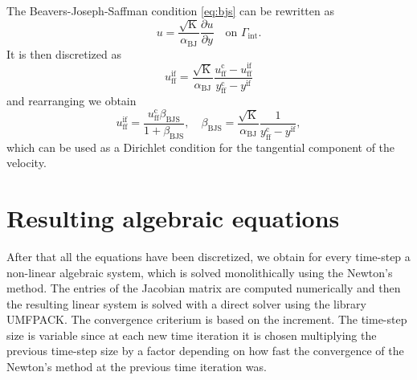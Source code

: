 The Beavers-Joseph-Saffman condition \eqref{eq:bjs} can be rewritten as
\begin{equation}
	u = \frac{\sqrt{\mathrm{K}}}{\alpha_\text{BJ}} \frac{\partial u}{\partial 
	y} \quad \text{on $\Gamma_\text{int}$}.
\end{equation}
It is then discretized as
\begin{equation} \label{eq:bjsdisc}
	u_\text{ff}^\text{if} = \frac{\sqrt{\mathrm{K}}}{\alpha_\text{BJ}} 
	\frac{u_\text{ff}^\text{c} - 
	u^\text{if}_\text{ff}}{y_\text{ff}^\text{c}-y^\text{if}}
\end{equation}
and rearranging we obtain
\begin{equation}
	u_\text{ff}^\text{if} = 	
	\frac{u^\text{c}_\text{ff} \beta_\text{BJS}}{1+\beta_\text{BJS}}, \quad 
	\beta_\text{BJS} = \frac{\sqrt{\mathrm{K}}}{\alpha_\text{BJ}} 
	\frac{1}{y_\text{ff}^\text{c}-y^\text{if}},
\end{equation}
which can be used as a Dirichlet condition for the tangential component of the 
velocity.
%
\section{Resulting algebraic equations} \label{sec:algeq}
After that all the equations have been discretized, we obtain for every 
time-step a non-linear algebraic system, which is solved monolithically using 
the Newton's method. The entries of the Jacobian matrix are computed 
numerically and then the resulting linear system is solved with a direct solver 
using the library UMFPACK. The convergence criterium is based on the increment. 
The time-step size is variable since at each new time iteration it is chosen 
multiplying the previous time-step size by a factor depending on how fast the 
convergence of the Newton's method at the previous time iteration was.